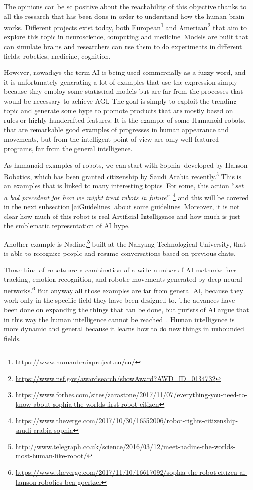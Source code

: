 The opinions can be so positive about the reachability of this objective thanks to all the research that has been done in order to understand how the human brain works. Different projects exist today, both European\footnote{\url{https://www.humanbrainproject.eu/en/}} and American\footnote{\url{https://www.nsf.gov/awardsearch/showAward?AWD\_ID=0134732}} that aim to explore this topic in neuroscience, computing and medicine. Models are built that can simulate brains and researchers can use them to do experiments in different fields: robotics, medicine, cognition.

However, nowadays the term AI is being used commercially as a fuzzy word, and it is unfortunately generating a lot of examples that use the expression simply because they employ some statistical models but are far from the processes that would be necessary to achieve AGI. The goal is simply to exploit the trending topic and generate some hype to promote products that are mostly based on rules or highly handcrafted features. It is the example of some Humanoid robots, that are remarkable good examples of progresses in human appearance and movements, but from the intelligent point of view are only well featured programs, far from the general intelligence.

As humanoid examples of robots, we can start with Sophia, developed by Hanson Robotics, which has been granted citizenship by Saudi Arabia recently.\footnote{\url{https://www.forbes.com/sites/zarastone/2017/11/07/everything-you-need-to-know-about-sophia-the-worlds-first-robot-citizen}} This is an examples that is linked to many interesting topics. For some, this action $``$\textit{set a bad precedent for how we might treat robots in future}$"$ \footnote{\url{https://www.theverge.com/2017/10/30/16552006/robot-rights-citizenship-saudi-arabia-sophia}} and this will be covered in the next subsection \ref{aiGuidelines} about some guidelines. Moreover, it is not clear how much of this robot is real Artificial Intelligence and how much is just the emblematic representation of AI hype.

Another example is Nadine,\footnote{\url{http://www.telegraph.co.uk/science/2016/03/12/meet-nadine-the-worlds-most-human-like-robot/}} built at the Nanyang Technological University, that is able to recognize people and resume conversations based on previous chats.

Those kind of robots are a combination of a wide number of AI methods: face tracking, emotion recognition, and robotic movements generated by deep neural networks.\footnote{\url{https://www.theverge.com/2017/11/10/16617092/sophia-the-robot-citizen-ai-hanson-robotics-ben-goertzel}} But anyway all those examples are far from general AI, because they work only in the specific field they have been designed to. The advances have been done on expanding the things that can be done, but purists of AI argue that in this way the human intelligence cannot be reached~\cite{pearl2018theoretical}. Human intelligence is more dynamic and general because it learns how to do new things in unbounded fields.

